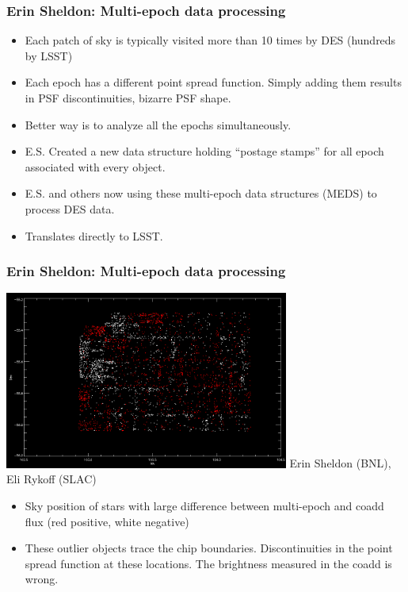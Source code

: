 \documentclass{beamer}
\begin{document}
\frame
{
    \frametitle{Erin Sheldon: Multi-epoch data processing}

    \begin{itemize}
        \item Each patch of sky is typically visited more than 10 times
            by DES (hundreds by LSST)
        \item Each epoch has a different point spread function.   Simply adding
            them results in PSF discontinuities, bizarre PSF shape. 
        \item Better way is to analyze all the epochs simultaneously.
        \item E.S. Created a new data structure holding ``postage stamps''
            for all epoch associated with every object.
        \item E.S. and others now using these multi-epoch data structures (MEDS) to 
            process DES data.
        \item Translates directly to LSST.
    \end{itemize}
}

\frame
{
    \frametitle{Erin Sheldon: Multi-epoch data processing}

    \begin{center}
        \includegraphics[width=0.7\textwidth]{delta_psf_pos.png}
        \newline
        Erin Sheldon (BNL), Eli Rykoff (SLAC)
    \end{center}

    \fontsize{9}{0.8\baselineskip}
    \begin{itemize}

        \item Sky position of stars with large difference between multi-epoch and
            coadd flux (red positive, white negative)

        \item These outlier objects trace the chip boundaries.  Discontinuities
            in the point spread function at these locations. The brightness
            measured in the coadd is wrong.

    \end{itemize}
}
\end{document}
